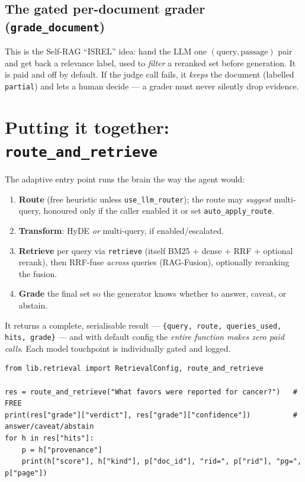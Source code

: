 \documentclass[11pt]{article}
\newcommand{\code}[1]{\texttt{#1}}
\begin{document}
\subsection{The gated per-document grader (\code{grade\_document})}

This is the Self-RAG ``ISREL'' idea: hand the LLM one $(\text{query}, \text{passage})$ pair and get
back a relevance label, used to \emph{filter} a reranked set before generation. It is paid and off by
default. If the judge call fails, it \emph{keeps} the document (labelled \code{partial}) and lets a
human decide --- a grader must never silently drop evidence.

\section{Putting it together: \texttt{route\_and\_retrieve}}

The adaptive entry point runs the brain the way the agent would:
\begin{enumerate}[leftmargin=*]
  \item \textbf{Route} (free heuristic unless \code{use\_llm\_router}); the route may \emph{suggest}
        multi-query, honoured only if the caller enabled it or set \code{auto\_apply\_route}.
  \item \textbf{Transform}: HyDE \emph{or} multi-query, if enabled/escalated.
  \item \textbf{Retrieve} per query via \code{retrieve} (itself BM25 $+$ dense $+$ RRF $+$ optional
        rerank), then RRF-fuse \emph{across} queries (RAG-Fusion), optionally reranking the fusion.
  \item \textbf{Grade} the final set so the generator knows whether to answer, caveat, or abstain.
\end{enumerate}
It returns a complete, serialisable result --- \code{\{query, route, queries\_used, hits, grade\}} ---
and with default config the \emph{entire function makes zero paid calls}. Each model touchpoint is
individually gated and logged.

\begin{lstlisting}
from lib.retrieval import RetrievalConfig, route_and_retrieve

res = route_and_retrieve("What favors were reported for cancer?")   # FREE
print(res["grade"]["verdict"], res["grade"]["confidence"])          # answer/caveat/abstain
for h in res["hits"]:
    p = h["provenance"]
    print(h["score"], h["kind"], p["doc_id"], "rid=", p["rid"], "pg=", p["page"])
\end{lstlisting}
\end{document}
